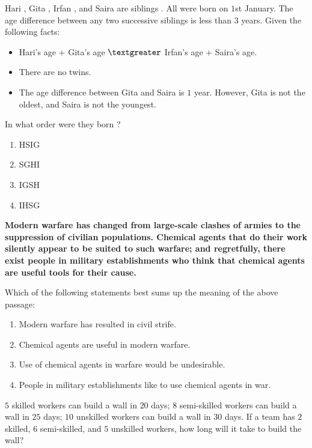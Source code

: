     \item Hari , Gita , Irfan , and Saira  are siblings . All were born on $1$st January. The age difference between any two successive siblings  is less than $3$ years. Given the following facts:
    
    \begin{itemize}
        \item Hari's age + Gita's age $\textgreater$ Irfan's age + Saira's age.
        \item There are no twins.
        \item The age difference between Gita and Saira is $1   $ year. However, Gita is not the oldest, and Saira is not the youngest.
    \end{itemize}

    In what order were they born ?

    \begin{enumerate}
        \item HSIG
        \item SGHI
        \item IGSH
        \item IHSG
    \end{enumerate}

    \item \textbf{Modern warfare has changed from large-scale clashes of armies to the suppression of civilian populations. Chemical agents that do their work silently appear to be suited to such warfare; and regretfully, there exist people in military establishments who think that chemical agents are useful tools for their cause.}

    Which of the following statements best sums up the meaning of the above passage:

    \begin{enumerate}
        \item Modern warfare has resulted in civil strife.
        \item Chemical agents are useful in modern warfare.
        \item Use of chemical agents in warfare would be undesirable.
        \item People in military establishments like to use chemical agents in war.
    \end{enumerate}

    \item $5$ skilled workers can build a wall in $20$ days; $8$ semi-skilled workers can build a wall in $25$ days; $10$ unskilled workers can build a wall in $30$ days. If a team has $2$ skilled, $6$ semi-skilled, and $5$ unskilled workers, how long will it take to build the wall?

